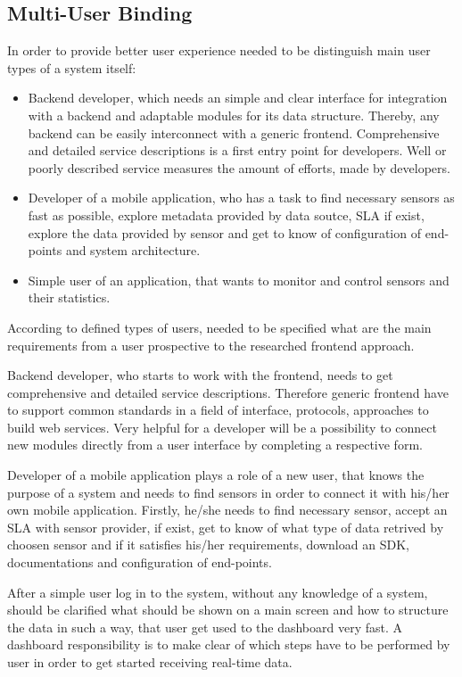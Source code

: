 \subsection {Multi-User Binding}
	In order to provide better user experience needed to be distinguish main user types of a system itself:
	\begin{itemize}
	\item Backend developer, which needs an simple and clear interface for integration with a backend and adaptable modules for its data structure. Thereby, any backend can be easily interconnect with a generic frontend. Comprehensive and detailed service descriptions is a first entry point for developers. Well or poorly described service measures the amount of efforts, made by developers. 
	\item Developer of a mobile application, who has a task to find necessary sensors as fast as possible, explore metadata provided by data soutce, SLA if exist, explore the data provided by sensor and get to know of configuration of end-points and system architecture.
	\item Simple user of an application, that wants to monitor and control sensors and their statistics.
	\end{itemize}
	According to defined types of users, needed to be specified what are the main requirements from a user prospective to the researched frontend approach.

	Backend developer, who starts to work with the frontend, needs to get comprehensive and detailed service descriptions. Therefore generic frontend have to support common standards in a field of interface, protocols, approaches to build web services. Very helpful for a developer will be a possibility to connect new modules directly from a user interface by completing a respective form.

	Developer of a mobile application plays a role of a new user, that knows the purpose of a system and needs to find sensors in order to connect it with his/her own mobile application. Firstly, he/she needs to find necessary sensor, accept an SLA with sensor provider, if exist, get to know of what type of data retrived by choosen sensor and if it satisfies his/her requirements, download an SDK, documentations and configuration of end-points.

	After a simple user log in to the system, without any knowledge of a system, should be clarified what should be shown on a main screen and how to structure the data in such a way, that user get used to the dashboard very fast. A dashboard responsibility is to make clear of which steps have to be performed by user in order to get started receiving real-time data.

